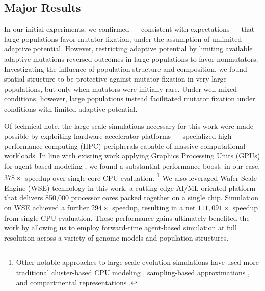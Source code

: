 \subsection{Major Results}

In our initial experiments, we confirmed --- consistent with expectations --- that large populations favor mutator fixation, under the assumption of unlimited adaptive potential.
However, restricting adaptive potential by limiting available adaptive mutations reversed outcomes in large populations to favor nonmutators.
Investigating the influence of population structure and composition, we found spatial structure to be protective against mutator fixation in very large populations, but only when mutators were initially rare.
Under well-mixed conditions, however, large populations instead facilitated mutator fixation under conditions with limited adaptive potential.

Of technical note, the large-scale simulations necessary for this work were made possible by exploiting hardware accelerator platforms --- specialized high-performance computing (HPC) peripherals capable of massive computational workloads.
In line with existing work applying Graphics Processing Units (GPUs) for agent-based modeling \citep{turpin2021xaevol,kosiachenko2019mass,perumalla2009switching,heinemann2007artificial,richmond2023flame}, we found a substantial performance boost: in our case, $378\times$ speedup over single-core CPU evaluation.
\footnote{%
Other notable approaches to large-scale evolution simulations have used more traditional cluster-based CPU modeling \citep{moreno2022best,collier2015large,ray1995proposal,turpin2020paevol}, sampling-based approximations \citep{taddei1997role}, and compartmental representations \citep{tenaillon1999mutators}.}
We also leveraged Wafer-Scale Engine (WSE) technology in this work, a cutting-edge AI/ML-oriented platform that delivers 850,000 processor cores packed together on a single chip.
Simulation on WSE achieved a further $294\times$ speedup, resulting in a net $111{,}091\times$ speedup from single-CPU evaluation.
These performance gains ultimately benefited the work by allowing us to employ forward-time agent-based simulation at full resolution across a variety of genome models and population structures.
